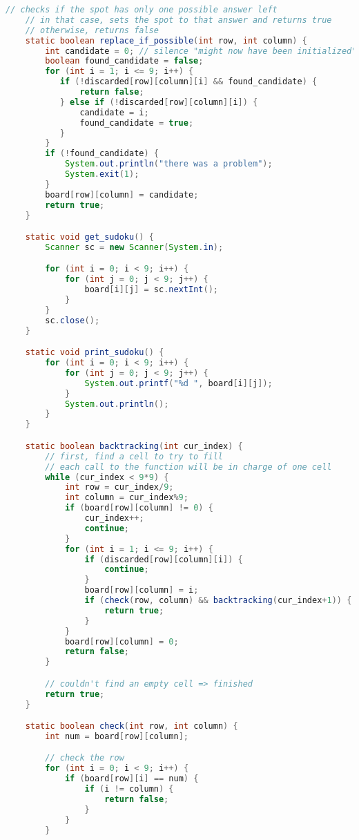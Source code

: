 \documentclass[
  spanish,
  a4paper,
,tablecaptionabove
]{scrartcl}
\begin{document}
\begin{lstlisting}[language=Java, basicstyle=\tiny]
    // checks if the spot has only one possible answer left
    // in that case, sets the spot to that answer and returns true
    // otherwise, returns false
    static boolean replace_if_possible(int row, int column) {
        int candidate = 0; // silence "might now have been initialized" error
        boolean found_candidate = false;
        for (int i = 1; i <= 9; i++) {
           if (!discarded[row][column][i] && found_candidate) {
               return false;
           } else if (!discarded[row][column][i]) {
               candidate = i;
               found_candidate = true;
           }
        }
        if (!found_candidate) {
            System.out.println("there was a problem");
            System.exit(1);
        }
        board[row][column] = candidate;
        return true;
    }

    static void get_sudoku() {
        Scanner sc = new Scanner(System.in);

        for (int i = 0; i < 9; i++) {
            for (int j = 0; j < 9; j++) {
                board[i][j] = sc.nextInt();
            }
        }
        sc.close();
    }

    static void print_sudoku() {
        for (int i = 0; i < 9; i++) {
            for (int j = 0; j < 9; j++) {
                System.out.printf("%d ", board[i][j]);
            }
            System.out.println();
        }
    }

    static boolean backtracking(int cur_index) {
        // first, find a cell to try to fill
        // each call to the function will be in charge of one cell
        while (cur_index < 9*9) {
            int row = cur_index/9;
            int column = cur_index%9;
            if (board[row][column] != 0) {
                cur_index++;
                continue;
            }
            for (int i = 1; i <= 9; i++) {
                if (discarded[row][column][i]) {
                    continue;
                }
                board[row][column] = i;
                if (check(row, column) && backtracking(cur_index+1)) {
                    return true;
                }
            }
            board[row][column] = 0;
            return false;
        }

        // couldn't find an empty cell => finished
        return true;
    }

    static boolean check(int row, int column) {
        int num = board[row][column];

        // check the row
        for (int i = 0; i < 9; i++) {
            if (board[row][i] == num) {
                if (i != column) {
                    return false;
                }
            }
        }


\end{lstlisting}
\end{document}
